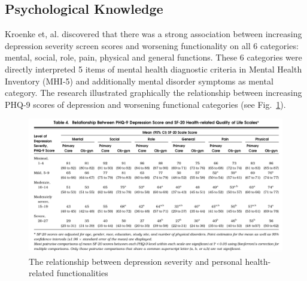 \documentclass[10pt,journal,compsoc]{IEEEtran}
\begin{document}
\subsection{Psychological Knowledge}
Kroenke et, al. \cite{Kroenke} discovered that there was a strong association between increasing depression severity screen scores and worsening functionality on all 6 categories: mental, social, role, pain, physical and general functions. These 6 categories were directly interpreted 5 items of mental health diagnostic criteria in Mental Health Inventory (MHI-5) and additionally mental disorder symptoms as mental category. The research illustrated graphically the relationship between increasing PHQ-9 scores of depression and worsening functional categories (see Fig.~\ref{fig2}). 
\begin{figure}[h]
\includegraphics[width=1\textwidth]{phq-9.png}
\caption{The relationship between depression severity and personal health-related functionalities\cite{Kroenke}} \label{fig2}
\end{figure}
\end{document}
